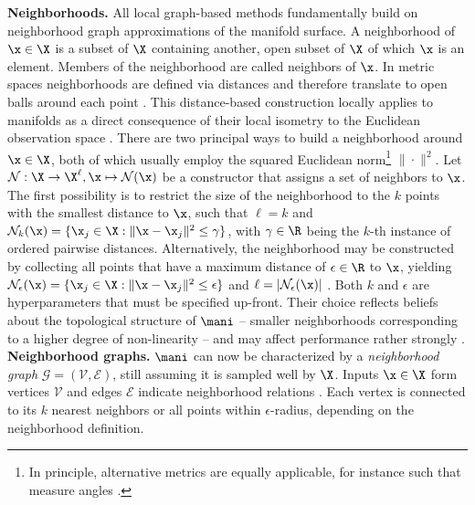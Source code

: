 \textbf{Neighborhoods.} All local graph-based methods fundamentally 
build on neighborhood graph approximations of the manifold surface.
A neighborhood of $\x \in \X$ is a subset of $\X$ containing another, open 
subset of $\X$ of which $\x$ is an element.
Members of the neighborhood are called neighbors of $\x$.
In metric spaces neighborhoods are defined via distances and therefore 
translate to open balls around each point \citep{waldmann2014}.
This distance-based construction locally applies to manifolds as a direct 
consequence of their local isometry to the Euclidean observation space 
\citep{mafu2011}.
There are two principal ways to build a neighborhood around $\x \in \X$, 
both of which usually employ the squared Euclidean norm\footnote{
In principle, alternative metrics are equally applicable, for instance such 
that measure angles \citep{belkinniyogi2004}.
} $\| \cdot \|^2$.
Let $\mathcal{N}: \X \rightarrow \X^{\ell}, \x \mapsto \mathcal{N} (\x)$ be a 
constructor that assigns a set of neighbors to $\x$.
The first possibility is to restrict the size of the neighborhood to the $k$ 
points with the smallest distance to $\x$, such that
$\ell = k$ and $\mathcal{N}_k(\x) = \{\x_j \in \X: 
\| \x - \x_j \|^2 \leq \gamma\}$, with $\gamma \in \R$ being the $k$-th instance 
of ordered pairwise distances.
Alternatively, the neighborhood may be constructed by collecting all points that
have a maximum distance of $\epsilon \in \R$ to $\x$, yielding 
$\mathcal{N}_{\epsilon} (\x) = 
\{\x_j \in \X: \| \x - \x_j \|^2 \leq \epsilon\}$ and 
$\ell = |\mathcal{N}_{\epsilon} (\x)|$ \citep{heetal2005}.
Both $k$ and $\epsilon$ are hyperparameters that must be specified up-front.
Their choice reflects beliefs about the topological structure of $\mani$ -- 
smaller neighborhoods corresponding to a higher degree of non-linearity -- and 
may affect performance rather strongly \citep{sudderth2002}.
\\

\textbf{Neighborhood graphs.}
$\mani$ can now be characterized by a \textit{neighborhood 
graph} $\mathcal{G} = (\mathcal{V}, \mathcal{E})$, still assuming it is 
sampled well by $\X$. 
Inputs $\x \in \X$ form vertices $\mathcal{V}$ and edges $\mathcal{E}$ 
indicate neighborhood relations \citep{belkinniyogi2001}.
Each vertex is connected to its $k$ nearest neighbors or all points 
within $\epsilon$-radius, depending on the neighborhood definition.

